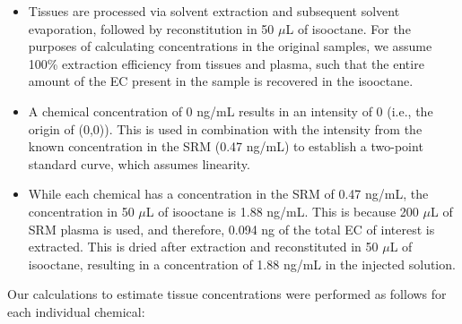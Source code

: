 \documentclass[
]{article}
\begin{document}
\begin{itemize}
\item Tissues are processed via solvent extraction and subsequent solvent evaporation, followed by reconstitution in 50 $\mu$L of isooctane. For the purposes of calculating concentrations in the original samples, we assume 100\% extraction efficiency from tissues and plasma, such that the entire amount of the EC present in the sample is recovered in the isooctane.
\item A chemical concentration of 0 ng/mL results in an intensity of 0 (i.e., the origin of (0,0)). This is used in combination with the intensity from the known concentration in the SRM (0.47 ng/mL) to establish a two-point standard curve, which assumes linearity.
\item While each chemical has a concentration in the SRM of 0.47 ng/mL, the concentration in 50 $\mu$L of isooctane is 1.88 ng/mL. This is because 200 $\mu$L of SRM plasma is used, and therefore, 0.094 ng of the total EC of interest is extracted. This is dried after extraction and reconstituted in 50 $\mu$L of isooctane, resulting in a concentration of 1.88 ng/mL in the injected solution.
\end{itemize}

\noindent Our calculations to estimate tissue concentrations were
performed as follows for each individual chemical:
\end{document}
